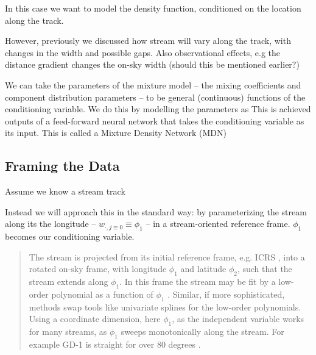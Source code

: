 \documentclass[twocolumn]{aastex631}
\newcommand{\stream}[1]{#1}
\begin{document}
        In this case we want to model the density function, conditioned on the location along the track.

        However, previously we discussed how stream will vary along the track, with changes in the width and possible gaps.
        Also observational effects, e.g the distance gradient changes the on-sky width (should this be mentioned earlier?)

        We can take the parameters of the mixture model -- the mixing coefficients and component distribution parameters -- to be general (continuous) functions of the conditioning variable.
        We do this by modelling the parameters as This is achieved outputs of a feed-forward neural network that takes the conditioning variable as its input. This is called a Mixture Density Network (MDN)



    \subsection{Framing the Data} \label{sub:framing_the_data}

        {\color{red} Assume we know a stream track}
        
        Instead we will approach this in the standard way: by parameterizing the stream along its the longitude -- $w_{\cdot, j\equiv0} \equiv \phi_1$ -- in a stream-oriented reference frame.
        $\phi_1$ becomes our conditioning variable.
         

        \begin{quotation}
            The stream is projected from its initial reference frame, e.g. ICRS
            \citep{ICRS1997}, into a rotated on-sky frame, with longitude $\phi_1$ and
            latitude $\phi_2$, such that the stream extends along $\phi_1$. In this frame
            the stream may be fit by a low-order polynomial as a function of $\phi_1$
            \citep[e.g.][]{Bonaca2020}. Similar, if more sophisticated, methods swap tools
            like univariate splines \citep[e.g.][]{Erkal2017, Bonaca2018} for the
            low-order polynomials. Using a coordinate dimension, here $\phi_1$, as the
            independent variable works for many streams, as $\phi_1$ sweeps monotonically
            along the stream. For example \stream{GD-1} is straight for over 80 degrees
            \citep{Webb2019, Price-Whelan2018}.
        \end{quotation}
\end{document}
